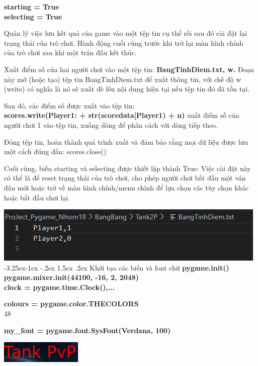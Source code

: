 \documentclass[a4paper]{article}
\makeatletter
\newcounter {subsubsubsection}[subsubsection]
\newcommand\subsubsubsection{\@startsection{subsubsubsection}{4}{\z@}%
                                     {-3.25ex\@plus -1ex \@minus -.2ex}%
                                     {1.5ex \@plus .2ex}%
                                     {\normalfont\normalsize\bfseries}}
\makeatother
\begin{document}
\textbf{starting = True}\\
\textbf{selecting = True}

Quản lý việc lưu kết quả của game vào một tệp tin cụ thể rồi sau đó cài
đặt lại trạng thái của trò chơi. Hành động cuối cùng trước khi trở lại
màn hình chính của trò chơi sau khi một trận đấu kết thúc.

Xuất điểm số của hai người chơi vào một tệp tin:
\textbf{BangTinhDiem.txt\textquotesingle,
\textquotesingle w\textquotesingle.} Đoạn này mở (hoặc tạo) tệp tin
BangTinhDiem.txt để xuất thông tin, với chế độ
\textquotesingle w\textquotesingle{} (write) có nghĩa là nó sẽ xuất đè
lên nội dung hiện tại nếu tệp tin đó đã tồn tại.

Sau đó, các điểm số được xuất vào tệp tin:\\
\textbf{scores.write(\textquotesingle Player1: \textquotesingle{} +
str(scoredata{[}\textquotesingle Player1\textquotesingle{]}) +
\textquotesingle n\textquotesingle)} xuất điểm số của người chơi 1 vào
tệp tin, xuống dòng để phân cách với dòng tiếp theo.

Đóng tệp tin, hoàn thành quá trình xuất và đảm bảo rằng mọi dữ liệu được
lưu một cách đúng đắn: scores.close()

Cuối cùng, biến starting và selecting được thiết lập thành True: Việc
cài đặt này có thể là để reset trạng thái của trò chơi, cho phép người
chơi bắt đầu một ván đấu mới hoặc trở về màn hình chính/menu chính để
lựa chọn các tùy chọn khác hoặc bắt đầu chơi lại.

\includegraphics[width=5.21806in,height=1.07222in]{image61.png}
\subsubsubsection{Khởi tạo các biến và font chữ}
\textbf{pygame.init()}\\
\textbf{pygame.mixer.init(44100, -16, 2, 2048)}\\
\textbf{clock = pygame.time.Clock(),...}

\textbf{colours = pygame.color.THECOLORS}\\
48

\textbf{my\_font =
pygame.font.SysFont(\textquotesingle Verdana\textquotesingle, 100)}

\includegraphics[width=1.54861in,height=0.41111in]{image62.png}
\end{document}
